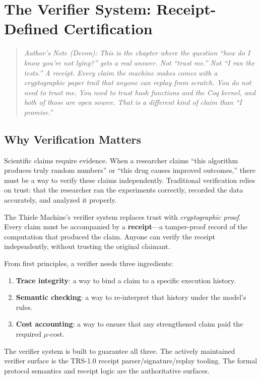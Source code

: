 \section{The Verifier System: Receipt-Defined Certification}

\begin{quote}
\textit{Author's Note (Devon): This is the chapter where the question ``how do I know you're not lying?'' gets a real answer. Not ``trust me.'' Not ``I ran the tests.'' A receipt. Every claim the machine makes comes with a cryptographic paper trail that anyone can replay from scratch. You do not need to trust me. You need to trust hash functions and the Coq kernel, and both of those are open source. That is a different kind of claim than ``I promise.''}
\end{quote}

\subsection{Why Verification Matters}

Scientific claims require evidence. When a researcher claims ``this algorithm produces truly random numbers'' or ``this drug causes improved outcomes,'' there must be a way to verify these claims independently. Traditional verification relies on trust: that the researcher ran the experiments correctly, recorded the data accurately, and analyzed it properly.

The Thiele Machine's verifier system replaces trust with \textit{cryptographic proof}. Every claim must be accompanied by a \textbf{receipt}---a tamper-proof record of the computation that produced the claim. Anyone can verify the receipt independently, without trusting the original claimant.

From first principles, a verifier needs three ingredients:
\begin{enumerate}
    \item \textbf{Trace integrity}: a way to bind a claim to a specific execution history.
    \item \textbf{Semantic checking}: a way to re-interpret that history under the model’s rules.
    \item \textbf{Cost accounting}: a way to ensure that any strengthened claim paid the required $\mu$-cost.
\end{enumerate}
The verifier system is built to guarantee all three.
The actively maintained verifier surface is the TRS-1.0 receipt parser/signature/replay tooling. The formal protocol semantics and receipt logic are the authoritative surfaces.

